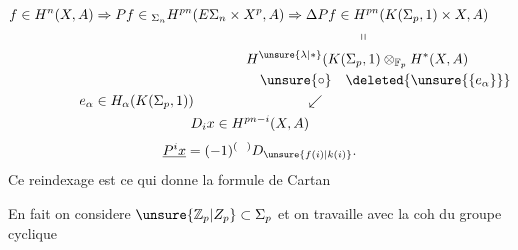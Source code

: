\[
\begin{aligned}
f\in H^n(X,A)&\Rightarrow Pf\in{}_{\Sigma_n}H^{pn}(E\Sigma_n\times X^p,A)
\Rightarrow\Delta Pf\in H^{pn}(K(\Sigma_p,1)\times X,A)\\
&\hspace{19em}\shortparallel\\
&\hspace{11em}H^{\unsure{\lambda|*}}(K(\Sigma_p,1)\otimes_{\mathbb F_p}H^*(X,A)\\
&\hspace{12em}\unsure{\circ}\quad\deleted{\unsure{\{e_\alpha\}}}\\
e_\alpha&\in H_{\alpha}(K(\Sigma_p,1))\hspace{8em}\swarrow\\
&\hspace{7em}D_i x\in H^{pn-i}(X,A)
\end{aligned}
\]
\[
\underline{P^i x}=(-1)^{(\ \ )}D_{\unsure{f(i)|k(i)}}.
\]
Ce reindexage est ce qui donne la formule de Cartan

En fait on considere \(\unsure{\mathbb Z_p|Z_p}\subset\Sigma_p\) et on travaille avec la coh du groupe cyclique
